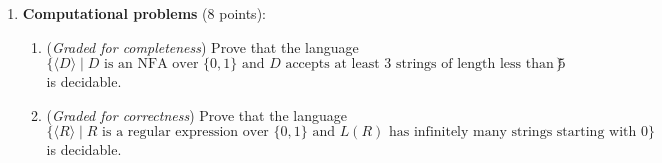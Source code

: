 \documentclass[12pt, oneside]{article}
\newcommand{\gradeCorrect}{({\it Graded for correctness}) }
\newcommand{\gradeComplete}{({\it Graded for completeness}) }
\begin{document}
\begin{enumerate}[wide, labelwidth=!, labelindent=0pt]
\item\textbf{Computational problems} (8 points):

\begin{enumerate}
    \item\gradeComplete Prove that the language $$\{\langle D \rangle \mid D \text{ is an NFA over $\{0,1\}$ and $D$ accepts at least $3$ strings 
    of length less than $5$ }\}$$
    is decidable.
    \item\gradeCorrect Prove that the language $$\{\langle R \rangle \mid R \text{ is a regular expression over $\{0,1\}$ and } L(R) \text{ has
    infinitely many strings starting with $0$} \}$$ is decidable.
\end{enumerate}

\end{enumerate}
\end{document}
